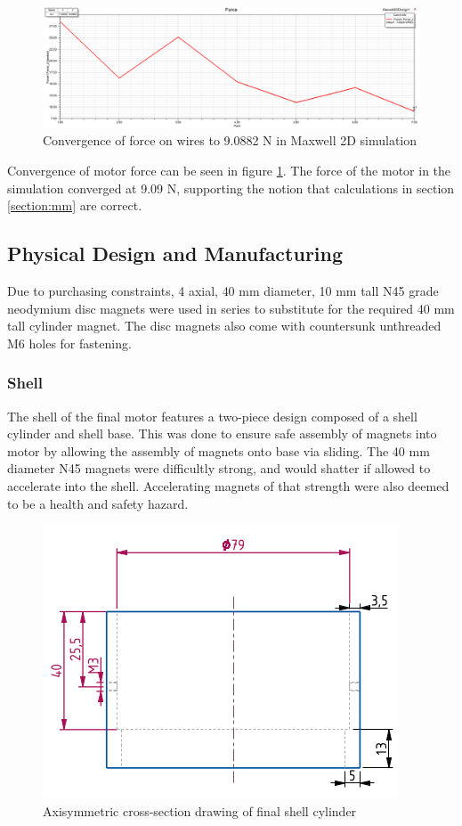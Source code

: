 \documentclass[a4paper,12pt]{article}
\begin{document}
\begin{figure}[h!]
    \centering
    \includegraphics[width=\textwidth]{force.png}
    \caption{Convergence of force on wires to 9.0882 N in Maxwell 2D simulation}
    \label{fg:maxwellforce}
\end{figure}

Convergence of motor force can be seen in figure \ref{fg:maxwellforce}. The force of the motor in the simulation converged at 9.09 N, supporting the notion that calculations in section \ref{section:mm} are correct.

\subsection{Physical Design and Manufacturing}

Due to purchasing constraints, 4 axial, 40 mm diameter, 10 mm tall N45 grade neodymium disc magnets were used in series to substitute for the required 40 mm tall cylinder magnet. The disc magnets also come with countersunk unthreaded M6 holes for fastening.

\subsubsection{Shell}

The shell of the final motor features a two-piece design composed of a shell cylinder and shell base. This was done to ensure safe assembly of magnets into motor by allowing the assembly of magnets onto base via sliding. The 40 mm diameter N45 magnets were difficultly strong, and would shatter if allowed to accelerate into the shell. Accelerating magnets of that strength were also deemed to be a health and safety hazard.

\begin{figure}[h!]
    \centering
    \includegraphics[scale=0.5]{shellcylinder.png}
    \caption{Axisymmetric cross-section drawing of final shell cylinder}
    \label{fg:shellcylinder}
\end{figure}
\end{document}
